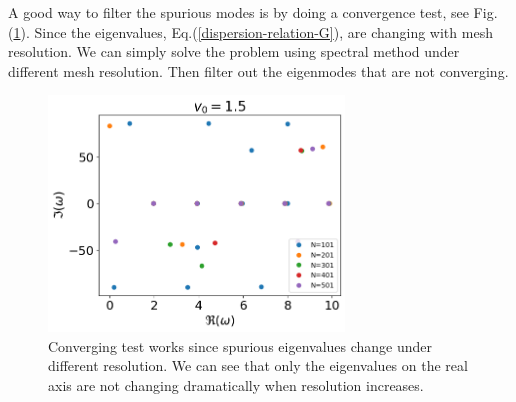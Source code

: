 A good way to filter the spurious modes is by doing a convergence test, see Fig.(\ref{fig:converging-test}). Since the eigenvalues, Eq.(\ref{dispersion-relation-G}), are changing with mesh resolution. We can simply solve the problem using spectral method under different mesh resolution. Then filter out the eigenmodes that are not converging.

\begin{figure}[htbp]
  \begin{center}
    \includegraphics[width=0.7\textwidth]{figures/convergence-test.png}
  \end{center}
  \caption{Converging test works since spurious eigenvalues change under different resolution. We can see that only the eigenvalues on the real axis are not changing dramatically when resolution increases.}
  \label{fig:converging-test}
\end{figure}


